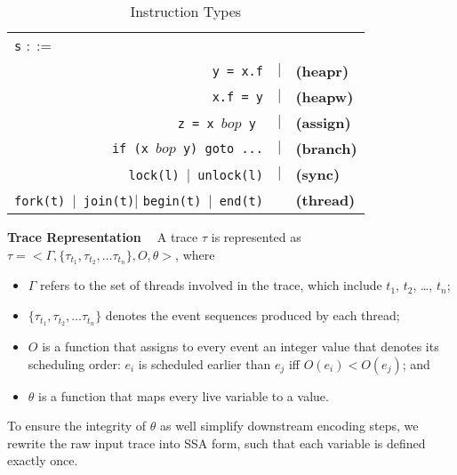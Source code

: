 \begin{table}
{ 
	\begin{center}
		\begin{tabular}{rcl}
			\multicolumn{1}{l}{{\tt s} $::=$} & & \\
			{\tt y = x.f} & $|$ & {\bf (heapr)} \\ 
			{\tt x.f = y}  & $|$ & {\bf (heapw)} \\ %
			{\tt z = x $bop$ y}\  & $|$ & {\bf (assign)} \\ %
			{\tt if (x $bop$  y) goto ...} & $|$ &  {\bf (branch)} \\
			{\tt lock(l)}\ $|$\ {\tt unlock(l)}  & $|$& {\bf (sync)} \\
			{\tt fork(t)}\ $|$\ {\tt join(t)}$|$ {\tt begin(t)}\ $|$\ {\tt end(t)} &  & {\bf (thread)}
		\end{tabular}
	\end{center}
	}
	\caption{\label{Ta:syntax}Instruction Types}
\vspace{-3em}
\end{table}


{\bf Trace Representation \ } A trace $\tau$ is represented as $\tau=<\Gamma , \{\tau_{t_1}, \tau_{t_2}, \dots \tau_{t_n} \}, O, \theta>$, where
\begin{itemize}
\item  $\Gamma$ refers to the set of threads involved in the trace, which include $t_1$, $t_2$, \dots, $t_n$;
\item   $\{\tau_{t_1}, \tau_{t_2}, \dots \tau_{t_n} \}$ denotes the event sequences produced by each thread;
\item  $O$ is a function that assigns  to every event an integer value that denotes its scheduling order: $e_i$ is scheduled earlier than $e_j$ iff $O(e_i)<O(e_j)$; and
\item  $\theta$ is a function that maps every live variable to a value. 
\end{itemize}
To ensure the integrity of $\theta$ as well simplify downstream encoding 
steps,
we rewrite the raw input trace into SSA form, such that each variable is defined exactly once.




